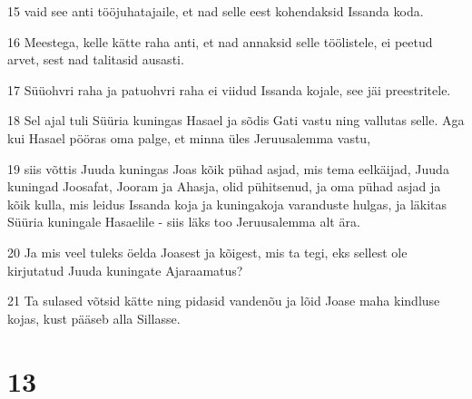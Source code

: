 \par 15 vaid see anti tööjuhatajaile, et nad selle eest kohendaksid Issanda koda.
\par 16 Meestega, kelle kätte raha anti, et nad annaksid selle töölistele, ei peetud arvet, sest nad talitasid ausasti.
\par 17 Süüohvri raha ja patuohvri raha ei viidud Issanda kojale, see jäi preestritele.
\par 18 Sel ajal tuli Süüria kuningas Hasael ja sõdis Gati vastu ning vallutas selle. Aga kui Hasael pööras oma palge, et minna üles Jeruusalemma vastu,
\par 19 siis võttis Juuda kuningas Joas kõik pühad asjad, mis tema eelkäijad, Juuda kuningad Joosafat, Jooram ja Ahasja, olid pühitsenud, ja oma pühad asjad ja kõik kulla, mis leidus Issanda koja ja kuningakoja varanduste hulgas, ja läkitas Süüria kuningale Hasaelile - siis läks too Jeruusalemma alt ära.
\par 20 Ja mis veel tuleks öelda Joasest ja kõigest, mis ta tegi, eks sellest ole kirjutatud Juuda kuningate Ajaraamatus?
\par 21 Ta sulased võtsid kätte ning pidasid vandenõu ja lõid Joase maha kindluse kojas, kust pääseb alla Sillasse.

\chapter{13}

